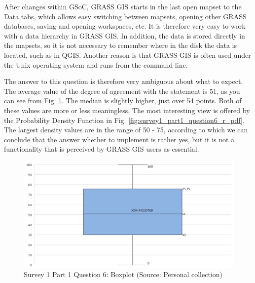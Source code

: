 \documentclass[a4paper,10pt,twoside]{article}
\begin{document}
After changes within GSoC, GRASS GIS starts in the last open mapset to the Data tabs, which allows easy switching between mapsets, opening other GRASS databases, saving and opening workspaces, etc. It is therefore very easy to work with a data hierarchy in GRASS GIS. In addition, the data is stored directly in the mapsets, so it is not necessary to remember where in the disk the data is located, such as in QGIS. Another reason is that GRASS GIS is often used under the Unix operating system and runs from the command line.

The answer to this question is therefore very ambiguous about what to expect. The average value of the degree of agreement with the statement is 51, as you can see from Fig. \ref{fig:survey1_part1_question6_boxplot}. The median is slightly higher, just over 54 points. Both of these values are more or less meaningless. The most interesting view is offered by the Probability Density Function in Fig. \ref{fig:survey1_part1_question6_r_pdf}. The largest density values are in the range of 50 - 75, according to which we can conclude that the answer whether to implement is rather yes, but it is not a functionality that is perceived by GRASS GIS users as essential.

\vspace{0.3cm}
\begin{figure}[hbt!] 
\begin{center}
\includegraphics[width=12.5cm]{../surveys/analyzed_data/survey1_part1_question6_boxplot.png} 
\caption[Survey 1 Part 1 Question 6: Boxplot]{Survey 1 Part 1 Question 6: Boxplot (Source: Personal collection)}
\label{fig:survey1_part1_question6_boxplot}
\end{center}
\end{figure}
\end{document}
